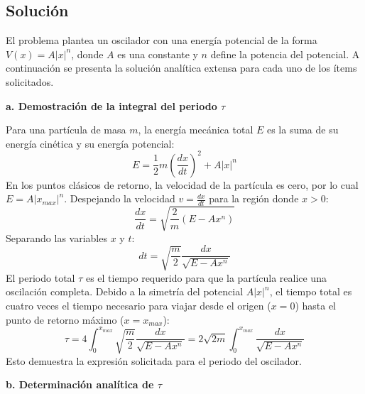 \documentclass[a4paper]{article}
\begin{document}
	
\subsection{Solución}

El problema plantea un oscilador con una energía potencial de la forma $V(x) = A|x|^n$, donde $A$ es una constante y $n$ define la potencia del potencial. A continuación se presenta la solución analítica extensa para cada uno de los ítems solicitados.

\textbf{a. Demostración de la integral del periodo $\tau$}

Para una partícula de masa $m$, la energía mecánica total $E$ es la suma de su energía cinética y su energía potencial:
$$E = \frac{1}{2}m\left(\frac{dx}{dt}\right)^2 + A|x|^n$$
En los puntos clásicos de retorno, la velocidad de la partícula es cero, por lo cual $E = A|x_{max}|^n$. Despejando la velocidad $v = \frac{dx}{dt}$ para la región donde $x > 0$:
$$\frac{dx}{dt} = \sqrt{\frac{2}{m}(E - Ax^n)}$$
Separando las variables $x$ y $t$:
$$dt = \sqrt{\frac{m}{2}} \frac{dx}{\sqrt{E - Ax^n}}$$
El periodo total $\tau$ es el tiempo requerido para que la partícula realice una oscilación completa. Debido a la simetría del potencial $A|x|^n$, el tiempo total es cuatro veces el tiempo necesario para viajar desde el origen ($x=0$) hasta el punto de retorno máximo ($x=x_{max}$):
$$\tau = 4 \int_{0}^{x_{max}} \sqrt{\frac{m}{2}} \frac{dx}{\sqrt{E - Ax^n}} = 2\sqrt{2m} \int_{0}^{x_{max}} \frac{dx}{\sqrt{E - Ax^n}}$$
Esto demuestra la expresión solicitada para el periodo del oscilador.

\textbf{b. Determinación analítica de $\tau$}
\end{document}
